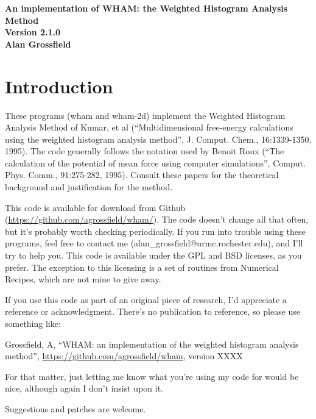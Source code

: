 \documentclass[12pt]{article}
\begin{document}
\begin{center}
\begin{LARGE}
{\bf An implementation of WHAM: the Weighted Histogram Analysis Method} \\
{\bf Version 2.1.0} \\
\vspace*{0.5in}
{\bf Alan Grossfield} \\
\end{LARGE}
\end{center}

\tableofcontents

\newpage

\section{Introduction}

These programs (wham and wham-2d) implement the Weighted Histogram
Analysis Method of Kumar, et al (``Multidimensional free-energy
calculations using the weighted histogram analysis method'',
J. Comput. Chem., 16:1339-1350, 1995).  The code generally
follows the notation used by Benoit Roux (``The calculation of the
potential of mean force using computer simulations'', Comput. Phys. Comm.,
91:275-282, 1995).  Consult these papers for the theoretical background
and justification for the method.

This code is available for download from Github
(\url{https://github.com/agrossfield/wham/}). The code doesn't
change all that often, but it's probably worth checking periodically.  If you
run into trouble using these programs, feel free to contact me
(alan\_grossfield@urmc.rochester.edu), and I'll try to help you.  This code
is available under the GPL and BSD licenses, as you prefer.  The exception to
this licensing is a set of routines from Numerical Recipes, which are not mine
to give away.

If you use this code as part of an original piece of research, I'd
appreciate a reference or acknowledgment.  There's no publication to
reference, so please use something like:

\noindent
Grossfield, A, ``WHAM: an implementation of the weighted histogram analysis
method'', \url{https://github.com/agrossfield/wham}, version XXXX

\noindent For that matter, just letting me know what you're using my code for
would be nice, although again I don't insist upon it.

Suggestions and patches are welcome.
\end{document}
